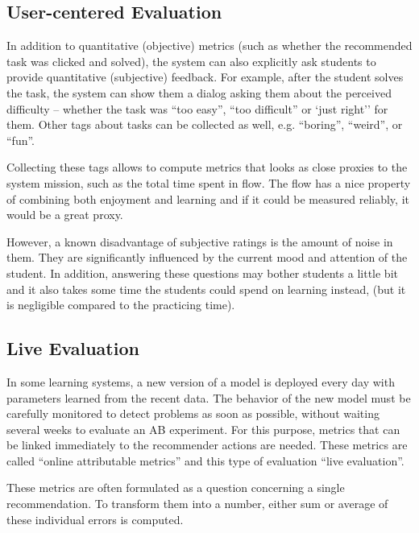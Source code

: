 \subsection{User-centered Evaluation}

In addition to quantitative (objective) metrics (such as whether the
recommended task was clicked and solved), the system can also explicitly ask
students to provide quantitative (subjective) feedback.
For example, after the student solves the task, the system can show them a dialog
asking them about the perceived difficulty -- whether the task was ``too
easy'', ``too difficult'' or `just right'' for them.
Other tags about tasks can be collected as well, e.g. ``boring'', ``weird'', or ``fun''.

Collecting these tags allows to compute metrics that looks as close proxies to
the system mission, such as the total time spent in flow.
The flow has a nice property of combining both enjoyment and learning
and if it could be measured reliably, it would be a great proxy.

However, a known disadvantage of subjective ratings is the amount of noise
in them. They are significantly influenced by the current mood and attention of
the student.
In addition, answering these questions may bother students a little bit
and it also takes some time the students could spend on learning instead,
(but it is negligible compared to the practicing time).




\subsection{Live Evaluation}
\label{sec:live-evaluation}

In some learning systems, a new version of a model is deployed every day
  with parameters learned from the recent data.
The behavior of the new model must be carefully monitored
  to detect problems as soon as possible,
  without waiting several weeks to evaluate an AB experiment.
For this purpose, metrics that can be linked immediately
  to the recommender actions are needed.
These metrics are called ``online attributable metrics''  %
and this type of evaluation ``live evaluation''.

These metrics are often formulated as a question concerning a single recommendation.
To transform them into a number, either sum or average of these individual errors is computed.


